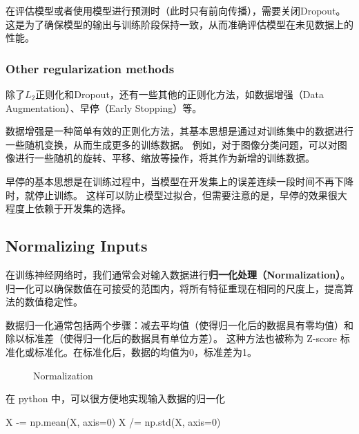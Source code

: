 在评估模型或者使用模型进行预测时（此时只有前向传播），需要关闭Dropout。这是为了确保模型的输出与训练阶段保持一致，从而准确评估模型在未见数据上的性能。

\subsubsection{Other regularization methods}

除了$L_2$正则化和Dropout，还有一些其他的正则化方法，如数据增强（Data Augmentation）、早停（Early Stopping）等。

数据增强是一种简单有效的正则化方法，其基本思想是通过对训练集中的数据进行一些随机变换，从而生成更多的训练数据。
例如，对于图像分类问题，可以对图像进行一些随机的旋转、平移、缩放等操作，将其作为新增的训练数据。

早停的基本思想是在训练过程中，当模型在开发集上的误差连续一段时间不再下降时，就停止训练。
这样可以防止模型过拟合，但需要注意的是，早停的效果很大程度上依赖于开发集的选择。

\subsection{Normalizing Inputs}

在训练神经网络时，我们通常会对输入数据进行\textbf{归一化处理（Normalization）}。
归一化可以确保数值在可接受的范围内，将所有特征重现在相同的尺度上，提高算法的数值稳定性。

数据归一化通常包括两个步骤：减去平均值（使得归一化后的数据具有零均值）和除以标准差（使得归一化后的数据具有单位方差）。
这种方法也被称为 Z-score 标准化或标准化。在标准化后，数据的均值为0，标准差为1。

\begin{figure}[h!bt]
    \centering
    \centering
    \caption{Normalization}
    \label{fig:normalization}
\end{figure}

在 python 中，可以很方便地实现输入数据的归一化
\begin{python}
X -= np.mean(X, axis=0)
X /= np.std(X, axis=0)
\end{python}

